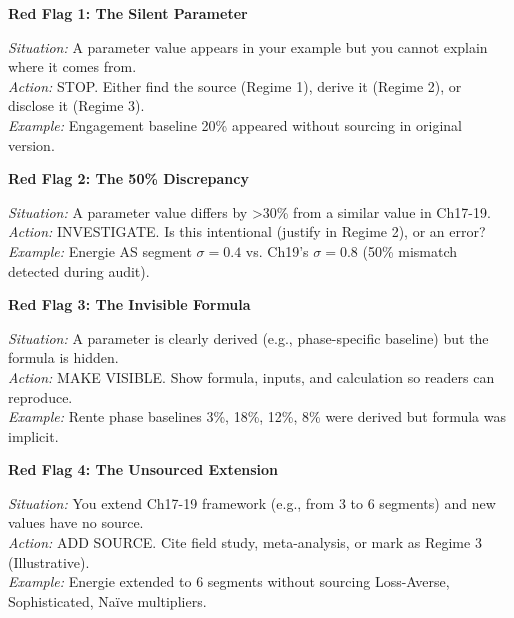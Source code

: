 \begin{table}[htbp]
\textbf{Red Flag 1: The Silent Parameter}
\begin{itemize}[nosep]
\textit{Situation:} A parameter value appears in your example but you cannot explain where it comes from.
\\ \textit{Action:} STOP. Either find the source (Regime 1), derive it (Regime 2), or disclose it (Regime 3).
\\ \textit{Example:} Engagement baseline 20\% appeared without sourcing in original version.
\end{itemize}

\textbf{Red Flag 2: The 50\% Discrepancy}
\begin{itemize}[nosep]
\textit{Situation:} A parameter value differs by >30\% from a similar value in Ch17-19.
\\ \textit{Action:} INVESTIGATE. Is this intentional (justify in Regime 2), or an error?
\\ \textit{Example:} Energie AS segment $\sigma = 0.4$ vs. Ch19's $\sigma = 0.8$ (50\% mismatch detected during audit).
\end{itemize}

\textbf{Red Flag 3: The Invisible Formula}
\begin{itemize}[nosep]
\textit{Situation:} A parameter is clearly derived (e.g., phase-specific baseline) but the formula is hidden.
\\ \textit{Action:} MAKE VISIBLE. Show formula, inputs, and calculation so readers can reproduce.
\\ \textit{Example:} Rente phase baselines 3\%, 18\%, 12\%, 8\% were derived but formula was implicit.
\end{itemize}

\textbf{Red Flag 4: The Unsourced Extension}
\begin{itemize}[nosep]
\textit{Situation:} You extend Ch17-19 framework (e.g., from 3 to 6 segments) and new values have no source.
\\ \textit{Action:} ADD SOURCE. Cite field study, meta-analysis, or mark as Regime 3 (Illustrative).
\\ \textit{Example:} Energie extended to 6 segments without sourcing Loss-Averse, Sophisticated, Naïve multipliers.
\end{itemize}





\end{table}
